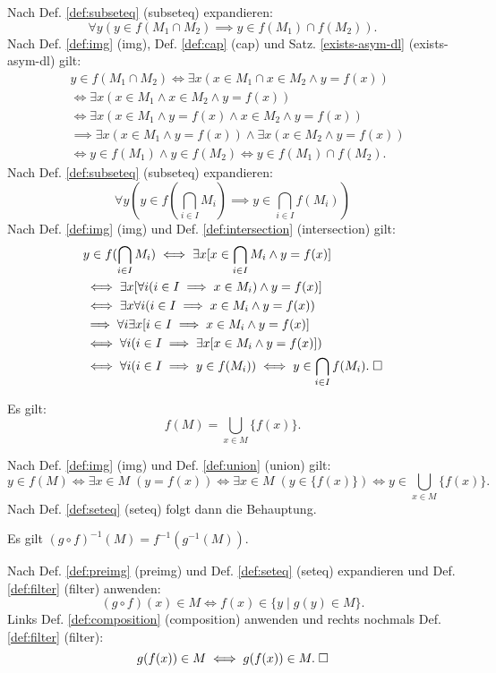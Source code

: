 \begin{Beweis}
Nach Def. \ref{def:subseteq} (subseteq) expandieren:
\[\forall y(y\in f(M_1\cap M_2)\implies y\in f(M_1)\cap f(M_2)).\]
Nach Def. \ref{def:img} (img), Def. \ref{def:cap} (cap)
und Satz. \ref{exists-asym-dl} (exists-asym-dl) gilt:
\begin{align*}
& y\in f(M_1\cap M_2) \iff \exists x(x\in M_1\cap x\in M_2\land y=f(x))\\
&\iff \exists x(x\in M_1\land x\in M_2\land y=f(x))\\
&\iff \exists x(x\in M_1\land y=f(x)\land x\in M_2\land y=f(x))\\
&\implies \exists x(x\in M_1\land y=f(x))\land\exists x(x\in M_2\land y=f(x))\\
&\iff y\in f(M_1)\land y\in f(M_2)\iff y\in f(M_1)\cap f(M_2).
\end{align*}
Nach Def. \ref{def:subseteq} (subseteq) expandieren:
\[\forall y(y\in f(\bigcap_{i\in I} M_i)\implies y\in \bigcap_{i\in I} f(M_i))\]
Nach Def. \ref{def:img} (img) und Def. \ref{def:intersection} (intersection)
gilt:
\begin{align*}
& y\in f(\bigcap_{i\in I} M_i)\iff \exists x[x\in\bigcap_{i\in I} M_i\land y=f(x)]\\
& \iff \exists x[\forall i(i\in I\implies x\in M_i)\land y=f(x)]\\
& \iff \exists x\forall i(i\in I\implies x\in M_i\land y=f(x))\\
& \implies \forall i\exists x[i\in I\implies x\in M_i\land y=f(x)]\\
& \iff \forall i(i\in I\implies \exists x[x\in M_i\land y=f(x)])\\
& \iff \forall i(i\in I\implies y\in f(M_i))
\iff y\in\bigcap_{i\in I} f(M_i).\;\square
\end{align*}
\end{Beweis}

\begin{Satz}\label{img-as-cup}
Es gilt:
\[f(M) = \bigcup_{x\in M} \{f(x)\}.\]
\end{Satz}

\begin{Beweis}
Nach Def. \ref{def:img} (img) und Def. \ref{def:union} (union) gilt:
\[y\in f(M) \iff \exists x{\in}M\;(y=f(x))
\iff \exists x{\in}M\;(y\in \{f(x)\})
\iff y\in\bigcup_{x\in M}\{f(x)\}.\]
Nach Def. \ref{def:seteq} (seteq) folgt dann die Behauptung.\,\qedsymbol
\end{Beweis}

\begin{Satz}
Es gilt $(g\circ f)^{-1}(M) = f^{-1}(g^{-1}(M))$.
\end{Satz}
\begin{Beweis}
Nach Def. \ref{def:preimg} (preimg) und Def. \ref{def:seteq} (seteq)
expandieren und Def. \ref{def:filter} (filter) anwenden:
\[(g\circ f)(x)\in M \iff f(x)\in\{y\mid g(y)\in M\}.\]
Links Def. \ref{def:composition} (composition) anwenden und rechts
nochmals Def. \ref{def:filter} (filter):
\[g(f(x))\in M \iff g(f(x))\in M.\;\square\]
\end{Beweis}

